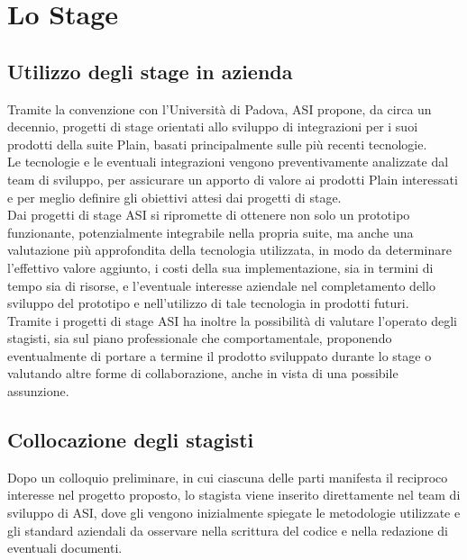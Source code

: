 \newpage
\chapter{Lo Stage}

\section{Utilizzo degli stage in azienda}
Tramite la convenzione con l'Università di Padova, ASI propone, da circa un decennio, progetti di stage orientati allo sviluppo di integrazioni per i suoi prodotti della suite Plain, basati principalmente sulle più recenti tecnologie.
\\
Le tecnologie e le eventuali integrazioni vengono preventivamente analizzate dal team di sviluppo, per assicurare un apporto di valore ai prodotti Plain interessati e per meglio definire gli obiettivi attesi dai progetti di stage.
\\
Dai progetti di stage ASI si ripromette di ottenere non solo un prototipo funzionante, potenzialmente integrabile nella propria suite, ma anche una valutazione più approfondita della tecnologia utilizzata, in modo da determinare l'effettivo valore aggiunto, i costi della sua implementazione, sia in termini di tempo sia di risorse, e l'eventuale interesse aziendale nel completamento dello sviluppo del prototipo e nell'utilizzo di tale tecnologia in prodotti futuri.
\\
Tramite i progetti di stage ASI ha inoltre la possibilità di valutare l'operato degli stagisti, sia sul piano professionale che comportamentale, proponendo eventualmente di portare a termine il prodotto sviluppato durante lo stage o valutando altre forme di collaborazione, anche in vista di una possibile assunzione.

\section{Collocazione degli stagisti}
Dopo un colloquio preliminare, in cui ciascuna delle parti manifesta il reciproco interesse nel progetto proposto, lo stagista viene inserito direttamente nel team di sviluppo di ASI, dove gli vengono inizialmente spiegate le metodologie utilizzate e gli standard aziendali da osservare nella scrittura del codice e nella redazione di eventuali documenti.

